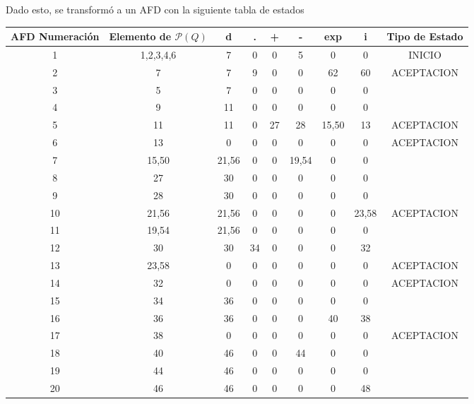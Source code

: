 Dado esto, se transformó a un AFD con la siguiente tabla de estados


\begin{longtable}{||c|c||cccccc||c||}
\hline
\hline
AFD Numeración & Elemento de $\mathcal{P} (Q)$ & d     & .  & +  & -     & exp   & i     & Tipo de Estado \\
\hline
\hline
1  & 1,2,3,4,6 & 7     & 0  & 0  & 5     & 0     & 0     & INICIO      \\
2  & 7         & 7     & 9  & 0  & 0     & 62    & 60    & ACEPTACION  \\
3  & 5         & 7     & 0  & 0  & 0     & 0     & 0     &             \\
4  & 9         & 11    & 0  & 0  & 0     & 0     & 0     &             \\
5  & 11        & 11    & 0  & 27 & 28    & 15,50 & 13    & ACEPTACION  \\
6  & 13        & 0     & 0  & 0  & 0     & 0     & 0     & ACEPTACION  \\
7  & 15,50     & 21,56 & 0  & 0  & 19,54 & 0     & 0     &             \\
8  & 27        & 30    & 0  & 0  & 0     & 0     & 0     &             \\
9  & 28        & 30    & 0  & 0  & 0     & 0     & 0     &             \\
10 & 21,56     & 21,56 & 0  & 0  & 0     & 0     & 23,58 & ACEPTACION  \\
11 & 19,54     & 21,56 & 0  & 0  & 0     & 0     & 0     &             \\
12 & 30        & 30    & 34 & 0  & 0     & 0     & 32    &             \\
13 & 23,58     & 0     & 0  & 0  & 0     & 0     & 0     & ACEPTACION  \\
14 & 32        & 0     & 0  & 0  & 0     & 0     & 0     & ACEPTACION  \\
15 & 34        & 36    & 0  & 0  & 0     & 0     & 0     &             \\
16 & 36        & 36    & 0  & 0  & 0     & 40    & 38    &             \\
17 & 38        & 0     & 0  & 0  & 0     & 0     & 0     & ACEPTACION  \\
18 & 40        & 46    & 0  & 0  & 44    & 0     & 0     &             \\
19 & 44        & 46    & 0  & 0  & 0     & 0     & 0     &             \\
20 & 46        & 46    & 0  & 0  & 0     & 0     & 48    &             \\

\end{longtable}
